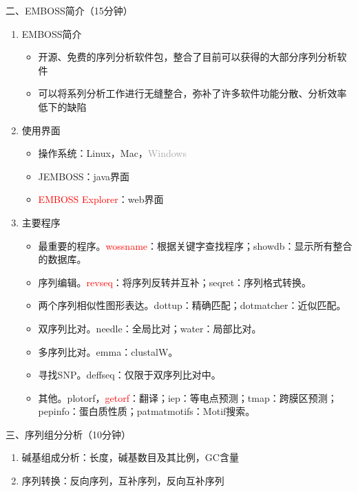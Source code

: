 \documentclass{TIJMUjiaoanSY}
\begin{document}
\vspace*{0.2cm}
\noindent
二、EMBOSS简介（15分钟）
\begin{enumerate}
  \item EMBOSS简介
  \begin{itemize}
    \item 开源、免费的序列分析软件包，整合了目前可以获得的大部分序列分析软件
    \item 可以将系列分析工作进行无缝整合，弥补了许多软件功能分散、分析效率低下的缺陷
  \end{itemize}
  \item 使用界面
  \begin{itemize}
    \item 操作系统：Linux，Mac，\textcolor{darkgray}{Windows}
    \item JEMBOSS：java界面
    \item \textcolor{red}{EMBOSS Explorer}：web界面
  \end{itemize}
  \item 主要程序
  \begin{itemize}
    \item 最重要的程序。\textcolor{red}{wossname}：根据关键字查找程序；showdb：显示所有整合的数据库。
    \item 序列编辑。\textcolor{red}{revseq}：将序列反转并互补；seqret：序列格式转换。
    \item 两个序列相似性图形表达。dottup：精确匹配；dotmatcher：近似匹配。
    \item 双序列比对。needle：全局比对；water：局部比对。
    \item 多序列比对。emma：clustalW。
    \item 寻找SNP。deffseq：仅限于双序列比对中。
    \item 其他。plotorf，\textcolor{red}{getorf}：翻译；iep：等电点预测；tmap：跨膜区预测；pepinfo：蛋白质性质；patmatmotifs：Motif搜索。
  \end{itemize}
\end{enumerate}

\vspace*{0.2cm}
\noindent
三、序列组分分析（10分钟）
\begin{enumerate}
  \item 碱基组成分析：长度，碱基数目及其比例，GC含量
  \item 序列转换：反向序列，互补序列，反向互补序列
\end{enumerate}


\otherTail
\newpage
\otherHeader
\end{document}
